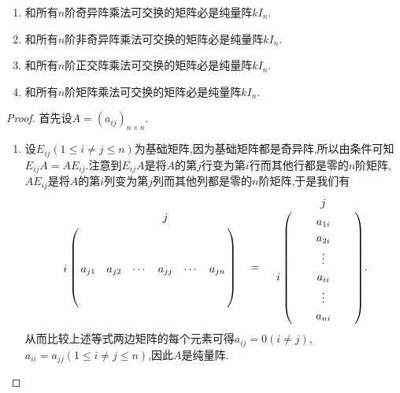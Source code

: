 \documentclass[../../main.tex]{subfiles}
\begin{document}
\begin{proposition}[纯量矩阵的刻画]\label{proposition:纯量阵的刻画}
\begin{enumerate}[(1)]
\item 和所有\(n\)阶奇异阵乘法可交换的矩阵必是纯量阵\(kI_{n}\).

\item 和所有\(n\)阶非奇异阵乘法可交换的矩阵必是纯量阵\(kI_{n}\).

\item 和所有\(n\)阶正交阵乘法可交换的矩阵必是纯量阵\(kI_{n}\).

\item 和所有\(n\)阶矩阵乘法可交换的矩阵必是纯量阵\(kI_{n}\).
\end{enumerate}

\end{proposition}
\begin{proof}
首先设$A=(a_{ij})_{n\times n}$.
\begin{enumerate}
\item 设\(E_{ij}(1\leq i\neq j\leq n)\)为基础矩阵,因为基础矩阵都是奇异阵,所以由条件可知\(E_{ij}A = AE_{ij}\).注意到\(E_{ij}A\)是将\(A\)的第\(j\)行变为第\(i\)行而其他行都是零的\(n\)阶矩阵,\(AE_{ij}\)是将\(A\)的第\(i\)列变为第\(j\)列而其他列都是零的\(n\)阶矩阵,于是我们有
\begin{align*}
\bordermatrix{%
&    &		&		&		j&		&
\cr
&    &		&		&		&		&		\cr
&   &		&		&		&		&		\cr
i&    a_{j1}&		a_{j2}&		\cdots&		a_{jj}&		\cdots&		a_{jn}
\cr
&    &		&		&		&		&		\cr
&    &		&		&		&		&		\cr
} \quad= \quad \bordermatrix{%
&    &       &             j&     &
\cr
&    &		&		a_{1i}&		&		\cr
&    &		&		a_{2i}&		&		\cr
&    &		&		\vdots&		&		\cr
i&    &		&		a_{ii}&		&		\cr
&    &		&		\vdots&		&		\cr
&    &		&		a_{ni}&		&		\cr
}.
\end{align*}
从而比较上述等式两边矩阵的每个元素可得\(a_{ij}=0(i\neq j)\),\(a_{ii}=a_{jj}(1\leq i\neq j\leq n)\),因此\(A\)是纯量阵.


\end{enumerate}
\end{proof}
\end{document}
